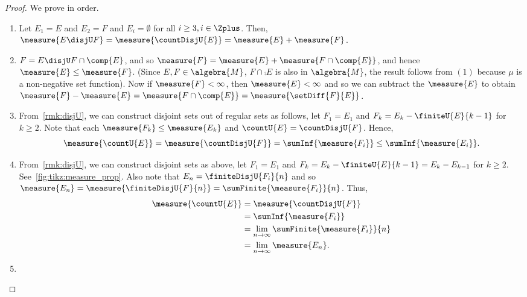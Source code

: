 \begin{proof}
    We prove in order.
    \begin{enumerate}
	\item 
	    Let $E_1 = E$ and $E_2 = F$ and $E_i = \emptyset$ for all $i \geq 3, i \in \Zplus$.
	    Then, $\measure{E\disjU F} = \measure{\countDisjU{E}} = \measure{E} + \measure{F}$.
	\item
	    $F = E \disjU F\cap\comp{E}$, and so $\measure{F} = \measure{E} +
	    \measure{F\cap\comp{E}}$, and hence $\measure{E} \leq \measure{F}$. 
	    (Since $E,F \in \algebra{M}$, $F\cap\comp{E}$ is also in
	    $\algebra{M}$, the result follows from $(1)$ because $\mu$ is a non-negative set
	    function). Now if $\measure{F} < \infty$, then $\measure{E} < \infty$ and so we can
	    subtract the $\measure{E}$ to obtain $\measure{F} - \measure{E} =
	    \measure{F\cap\comp{E}} = \measure{\setDiff{F}{E}}$.
	\item 
	    From~\ref{rmk:disjU}, we can construct disjoint sets out of regular sets as follows,
	    let $F_1 = E_1$ and $F_k = E_k - \finiteU{E}{k-1}$ for $k \geq 2$. 
	    Note that each $\measure{F_k} \leq \measure{E_k}$ and $\countU{E} = \countDisjU{F}$. 
	    Hence, \[\measure{\countU{E}} = \measure{\countDisjU{F}} = \sumInf{\measure{F_i}} \leq
		\sumInf{\measure{E_i}}.\]
	\item
	   From~\ref{rmk:disjU}, we can construct disjoint sets as above, let $F_1 = E_1$ and 
	   $F_k = E_k - \finiteU{E}{k-1} = E_k - E_{k-1}$ for $k \geq 2$.
	   See~\ref{fig:tikz:measure_prop}. Also note that 
	   $E_n = \finiteDisjU{F_i}{n}$ and so $\measure{E_n} = \measure{\finiteDisjU{F}{n}} =
	   \sumFinite{\measure{F_i}}{n}$. Thus,
	   \begin{align*}
	       \measure{\countU{E}} &=\measure{\countDisjU{F}}  \\
	       &=\sumInf{\measure{F_i}} \\
	       &=\lim\limits_{n\to\infty}\sumFinite{\measure{F_i}}{n} \\
	       &=\lim\limits_{n\to\infty}\measure{E_n}. 
	   \end{align*}
	   


       \item
	   

\end{enumerate}
\end{proof}
